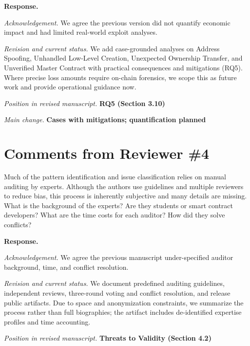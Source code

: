 \documentclass[acmsmall]{acmart}
\begin{document}
	\noindent
	\textbf{Response.}

	\textit{Acknowledgement.} We agree the previous version did not quantify economic impact and had
	limited real-world exploit analyses.

	\textit{Revision and current status.} We add case-grounded analyses on Address Spoofing, Unhandled
	Low-Level Creation, Unexpected Ownership Transfer, and Unverified Master Contract with practical
	consequences and mitigations (RQ5). Where precise loss amounts require on-chain forensics, we scope
	this as future work and provide operational guidance now.

	\textit{Position in revised manuscript.} {\color{red}\textbf{RQ5 (Section 3.10)}}

	\textit{Main change.} {\color{blue}\textbf{Cases with mitigations; quantification planned}}

	\newpage
	\section{Comments from Reviewer \#4}

	\begin{tcolorbox}
		[commentbox,title=Reviewer \#4 -- Comment 1] Much of the pattern identification and issue classification
		relies on manual auditing by experts. Although the authors use guidelines and multiple
		reviewers to reduce bias, this process is inherently subjective and many details are missing.
		What is the background of the experts? Are they students or smart contract developers? What
		are the time costs for each auditor? How did they solve conflicts?
	\end{tcolorbox}

	\noindent
	\textbf{Response.}

	\textit{Acknowledgement.} We agree the previous manuscript under-specified auditor background, time,
	and conflict resolution.

	\textit{Revision and current status.} We document predefined auditing guidelines, independent
	reviews, three-round voting and conflict resolution, and release public artifacts. Due to space and
	anonymization constraints, we summarize the process rather than full biographies; the artifact includes
	de-identified expertise profiles and time accounting.

	\textit{Position in revised manuscript.} {\color{red}\textbf{Threats to Validity (Section 4.2)}}
\end{document}
